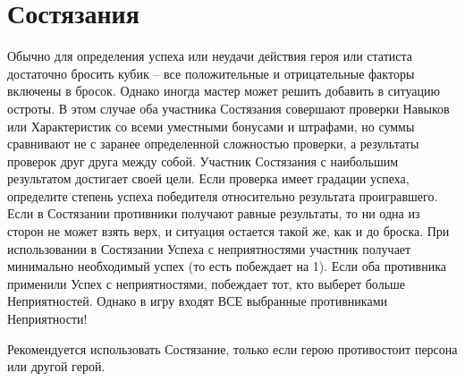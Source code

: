 \section{Состязания}
Обычно для определения успеха или неудачи действия героя или статиста достаточно бросить кубик – все положительные и отрицательные факторы включены в бросок. Однако иногда мастер может решить добавить в ситуацию остроты. В этом случае оба участника Состязания совершают проверки Навыков или Характеристик со всеми уместными бонусами и штрафами, но суммы сравнивают не с заранее определенной сложностью проверки, а результаты проверок друг друга между собой. Участник Состязания с наибольшим результатом достигает своей цели. Если проверка имеет градации успеха, определите степень успеха победителя относительно результата проигравшего.
\newline Если в Состязании противники получают равные результаты, то ни одна из сторон не может взять верх, и ситуация остается такой же, как и до броска.
\newline При использовании в Состязании Успеха с неприятностями участник получает минимально необходимый успех (то есть побеждает на 1). Если оба противника применили Успех с неприятностями, побеждает тот, кто выберет больше Неприятностей. Однако в игру входят ВСЕ выбранные противниками Неприятности!
\begin{tcolorbox}
Рекомендуется использовать Состязание, только если герою противостоит персона или другой герой.
\end{tcolorbox}